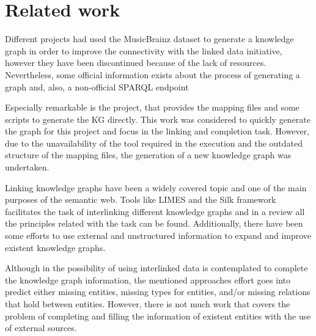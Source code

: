 \section{Related work}
Different projects had used the MusicBrainz dataset to generate a knowledge graph in order to improve the connectivity with the linked data initiative, however they have been discontinued because of the lack of resources.
Nevertheless, some official information exists about the process of generating a graph \citep{musicbrainz_map} and, also, a non-official SPARQL endpoint \citep{musicbrainz_endpoint} 

Especially remarkable is the \citet{musicbrainz_map} project, that provides the mapping files and some scripts to generate the KG directly. This work was considered to quickly generate the graph for this project and focus in the linking and completion task. However, due to the unavailability of the tool required in the execution and the outdated structure of the mapping files, the generation of a new knowledge graph was undertaken. 

Linking knowledge graphs have been a widely covered topic and one of the main purposes of the semantic web. Tools like LIMES \citep{limes} and the Silk \citep{silk} framework facilitates the task of interlinking different knowledge graphs and in \citet{linking_book} a review all the principles related with the task can be found. Additionally, there have been some efforts to use external and unstructured information to expand and improve existent knowledge graphs. 

Although in \citet{refinement_survey} the possibility of using interlinked data is contemplated to complete the knowledge graph information, the mentioned approaches effort goes into predict either missing entities, missing types for entities, and/or missing relations that hold between entities. However, there is not much work that covers the problem of completing and filling the information of existent entities with the use of external sources.